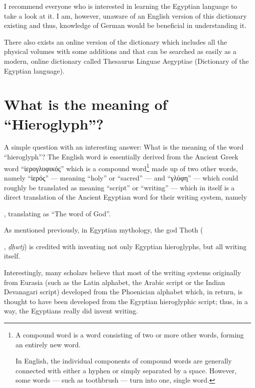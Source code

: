 \documentclass[a5paper,twoside,11pt]{report}
\begin{document}
	I recommend everyone who is interested in learning the Egyptian language to take a look at it. I am, however, unaware of an English version of this dictionary existing and thus, knowledge of German would be beneficial in understanding it.

  There also exists an online version of the dictionary which includes all the physical volumes with some additions and that can be searched as easily as a modern, online dictionary called Thesaurus Linguae Aegyptiae (Dictionary of the Egyptian language).

\chapter*{What is the meaning of ``Hieroglyph''?}

  A simple question with an interesting answer: What is the meaning of the word “hieroglyph”?
	The English word is essentially derived from the Ancient Greek word “ἱερογλυφικός” which is a compound word\footnote{A compound word is a word consisting of two or more other words, forming an entirely new word.

	In English, the individual components of compound words are generally connected with either a hyphen or simply separated by a space. However, some words — such as toothbrush — turn into one, single word.} made up of two other words, namely “ἱερός” — meaning “holy” or “sacred” — and “γλύφη” — which could roughly be translated as meaning “script” or “writing” — which in itself is a direct translation of the Ancient Egyptian word for their writing system, namely \begin{hieroglyph}{\leavevmode {}}\end{hieroglyph}, translating as “The word of God”.

	As mentioned previously, in Egyptian mythology, the god Thoth (\begin{hieroglyph}{\leavevmode {}\HinterSignsSpace
{}}\end{hieroglyph}, \textit{ḏḥwtj}) is credited with inventing not only Egyptian hieroglyphs, but all writing itself.

	Interestingly, many scholars believe that most of the writing systems originally from Eurasia (such as the Latin alphabet, the Arabic script or the Indian Devanagari script) developed from the Phoenician alphabet which, in return, is thought to have been developed from the Egyptian hieroglyphic script; thus, in a way, the Egyptians really did invent writing. 
\end{document}
